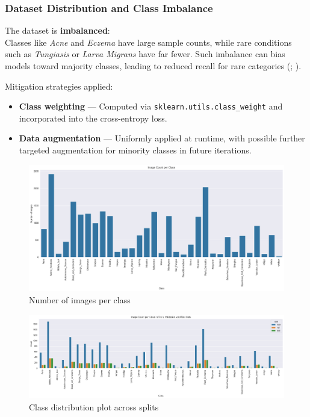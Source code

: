 \documentclass[
  12pt,
  oneside]{article}
\providecommand{\tightlist}{%
  \setlength{\itemsep}{0pt}\setlength{\parskip}{0pt}}
\begin{document}
\subsubsection{Dataset Distribution and Class
Imbalance}\label{dataset-distribution-and-class-imbalance}

The dataset is \textbf{imbalanced}:\\
Classes like \emph{Acne} and \emph{Eczema} have large sample counts,
while rare conditions such as \emph{Tungiasis} or \emph{Larva Migrans}
have far fewer. Such imbalance can bias models toward majority classes,
leading to reduced recall for rare categories
(;
).

Mitigation strategies applied:

\begin{itemize}
\tightlist
\item
  \textbf{Class weighting} --- Computed via
  \texttt{sklearn.utils.class\_weight} and incorporated into the
  cross-entropy loss.
\item
  \textbf{Data augmentation} --- Uniformly applied at runtime, with
  possible further targeted augmentation for minority classes in future
  iterations.
\end{itemize}

\begin{figure}

{\centering \includegraphics[width=1\linewidth]{images_per_class} 

}

\caption{Number of images per class}\label{fig:unnamed-chunk-1}
\end{figure}

\begin{figure}

{\centering \includegraphics[width=1\linewidth]{class_distribution} 

}

\caption{Class distribution plot across splits}\label{fig:unnamed-chunk-2}
\end{figure}
\end{document}
